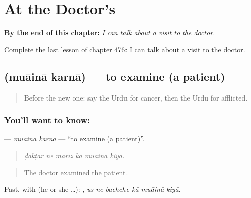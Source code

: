 
\chapter{At the Doctor's}
\label{ch:ur-at-the-doctor-s}

\begin{chapteropening}
\textbf{By the end of this chapter:} \emph{I can talk about a visit to the doctor.}

Complete the last lesson of chapter 476: I can talk about a visit to the doctor.
\end{chapteropening}

\section[\texorpdfstring{\ur{معائنہ} \ur{کرنا} (muāinā karnā)}{معائنہ کرنا (muāinā karnā)}]{  (muāinā karnā) — to examine (a patient)}

\label{lesson:UR-C476-muaina-karna}



\begin{quote}
Before the new one: say the Urdu for cancer, then the Urdu for afflicted.
\end{quote}

\subsection*{You'll want to know:  }
\textbf{ } — \emph{muāinā karnā} — \textquotedblleft{}to examine (a patient)\textquotedblright{}.

\begin{quote}
     
\end{quote}

\begin{quote}
\emph{ḍākṭar ne marīz kā muāinā kiyā.}
\end{quote}

\begin{quote}
The doctor examined the patient.
\end{quote}

Past, with  (he or she …):      , \emph{us ne bachche kā muāinā kiyā}.

